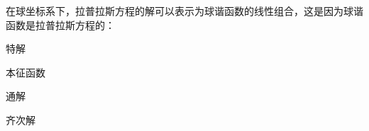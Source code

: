 \documentclass{njustexam}
\begin{document}
   
    \begin{problem}
      在球坐标系下，拉普拉斯方程的解可以表示为球谐函数的线性组合，这是因为球谐函数是拉普拉斯方程的：
      \begin{abcd}
      \item 特解
      \item 本征函数
      \item 通解
      \item 齐次解
      \end{abcd}
      \end{problem}



\end{document}
